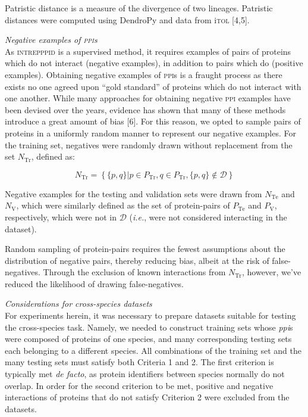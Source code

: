 Patristic distance is a measure of the divergence of two lineages. Patristic distances were computed using DendroPy and data from i\textsc{tol} [4,5].

\textit{Negative examples of \textsc{ppi}s}\\
As \textsc{intrepppid} is a supervised method, it requires examples of pairs of proteins which do not interact (negative examples), in addition to pairs which do (positive examples). Obtaining negative examples of \textsc{ppi}s is a fraught process as there exists no one agreed upon ``gold standard'' of proteins which do not interact with one another. While many approaches for obtaining negative \textsc{ppi} examples have been devised over the years, evidence has shown that many of these methods introduce a great amount of bias [6]. For this reason, we opted to sample pairs of proteins in a uniformly random manner to represent our negative examples. For the training set, negatives were randomly drawn without replacement from the set $N_\textrm{Tr}$, defined as:

$$
N_\textrm{Tr} = \left\{\{p,q\} | p \in P_\textrm{Tr}, q \in P_\textrm{Tr}, \{p,q\} \notin \mathcal{D} \right\}
$$

Negative examples for the testing and validation sets were drawn from $N_\textrm{Te}$ and $N_\textrm{V}$, which were similarly defined as the set of protein-pairs of $P_\textrm{Te}$ and $P_\textrm{V}$, respectively, which were not in $\mathcal{D}$ (\textit{i.e.}, were not considered interacting in the dataset).

Random sampling of protein-pairs requires the fewest assumptions about the distribution of negative pairs, thereby reducing bias, albeit at the risk of false-negatives. Through the exclusion of known interactions from $N_\textrm{Tr}$, however, we’ve reduced the likelihood of drawing false-negatives.

\textit{Considerations for cross-species datasets}\\
For experiments herein, it was necessary to prepare datasets suitable for testing the cross-species task. Namely, we needed to construct training sets whose \textit{ppi}s were composed of proteins of one species, and many corresponding testing sets each belonging to a different species. All combinations of the training set and the many testing sets must satisfy both Criteria 1 and 2. The first criterion is typically met \textit{de facto}, as protein identifiers between species normally do not overlap. In order for the second criterion to be met, positive and negative interactions of proteins that do not satisfy Criterion 2 were excluded from the datasets.
\newpage
